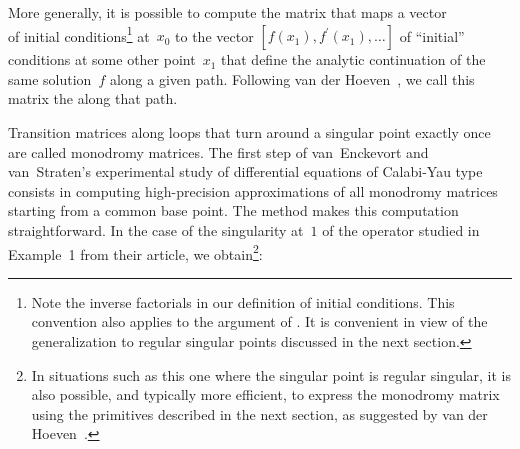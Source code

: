 \documentclass[runningheads,a4paper]{llncs}
\begin{document}

More generally, it is possible to compute the matrix that maps a vector
\begin{equation}
  [f (x_0), f^{\prime} (x_0), \tfrac{1}{2} f^{\prime\prime} (x_0), \ldots,
  \tfrac{1}{(r - 1) !} f^{(r - 1)} (x_0)] \label{eq:ini}
\end{equation}
of initial conditions\footnote{Note the inverse factorials in our definition of
initial conditions. This convention also applies to the 
argument of . It is convenient in view of the
generalization to regular singular points discussed in the next section.}
at~$x_0$ to the vector $[f (x_1), f^{\prime} (x_1), \ldots]$ of ``initial''
conditions at some other point~$x_1$ that define the analytic continuation of
the same solution~$f$ along a given path.
Following van der Hoeven~\cite{vdH1999},
we call this matrix the
{} along that path.


\begin{example}
  Transition matrices along loops that turn around a singular point exactly
  once are called monodromy matrices. The first step of van~Enckevort and van~Straten's
  experimental study of differential equations of Calabi-Yau
  type~{\cite{EnckevortStraten2006}} consists in computing
  high-precision approximations of all monodromy matrices starting from a
  common base point. The  method
  makes this computation straightforward. In the case of the singularity
  at~$1$ of the operator studied in Example~1 from their article, we
  obtain\footnote{In situations such as this one where the singular point is
  regular singular, it is also possible, and typically more efficient, to
  express the monodromy matrix using the primitives described in the next
  section, as suggested by van der Hoeven~{\cite{vdH2001}}.}:
\end{example}
\end{document}
